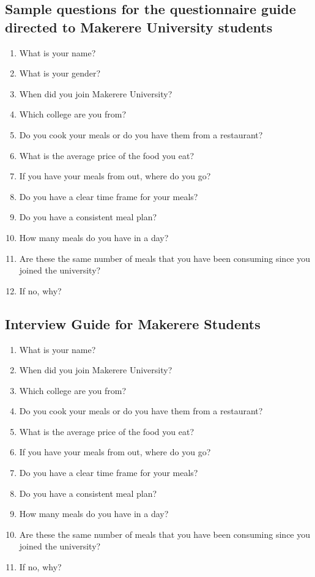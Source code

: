 \documentclass{article}
\begin{document}
\subsection{Sample questions for the questionnaire guide directed to Makerere University students}
\begin{enumerate}
\item What is your name?
\item What is your gender?
\item When did you join Makerere University?
\item Which college are you from?
\item Do you cook your meals or do you have them from a restaurant?
\item What is the average price of the food you eat?
\item If you have your meals from out, where do you go?
\item Do you have a clear time frame for your meals?
\item Do you have a consistent meal plan?
\item How many meals do you have in a day?
\item Are these the same number of meals that you have been consuming since you joined the university?
\item If no, why?
\end{enumerate}

\subsection{Interview Guide for Makerere Students}
\begin{enumerate}
\item What is your name?
\item When did you join Makerere University?
\item Which college are you from?
\item Do you cook your meals or do you have them from a restaurant?
\item What is the average price of the food you eat?
\item If you have your meals from out, where do you go?
\item Do you have a clear time frame for your meals?
\item Do you have a consistent meal plan?
\item How many meals do you have in a day?
\item Are these the same number of meals that you have been consuming since you joined the university?
\item If no, why?
\end{enumerate}
\end{document}
